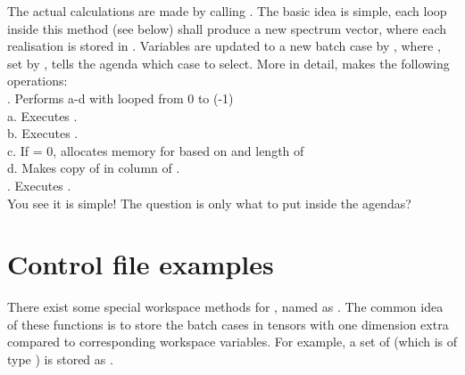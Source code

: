 The actual calculations are made by calling . The
basic idea is simple, each loop inside this method (see below) shall
produce a new spectrum vector, where each realisation is stored in
. Variables are updated to a new batch case by
, where , set by
, tells the agenda which case to select.
More in detail,  makes the following operations:\\
. Performs a-d with  looped from 0 to (-1)\\
\indent a. Executes . \\
\indent b. Executes .\\
\indent c. If  = 0, allocates memory for
 based on  and length of  \\
\indent d. Makes copy of  in column  of .\\
. Executes .\\
You see it is simple! The question is only what to put inside the agendas?


\section{Control file examples}
%
There exist some special workspace methods for
, named as
.  The common idea of these functions is to
store the batch cases in tensors with one dimension extra compared to
corresponding workspace variables. For example, a set of
 (which is of type ) is stored
as .

